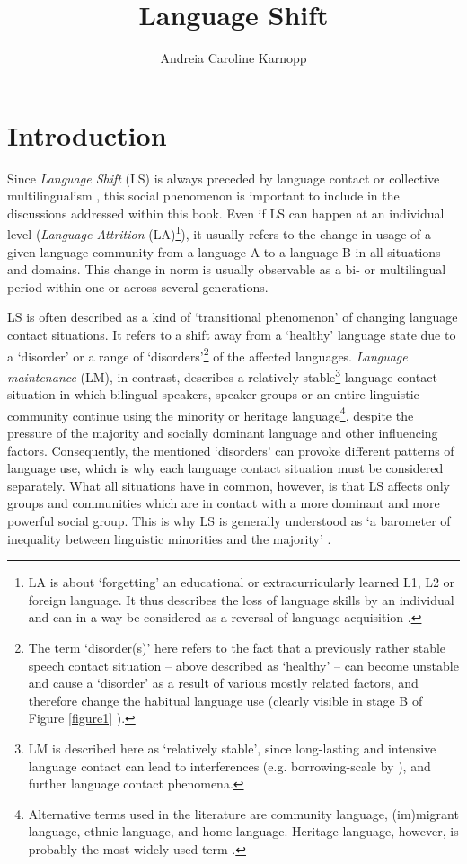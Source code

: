 \documentclass[output=paper,
modfonts
]{langscibook}
\title{Language Shift}
\author{%
 Andreia Caroline Karnopp\affiliation{University of Zurich}
}
\begin{document}
\maketitle

\section{Introduction}

Since \emph{Language Shift} (LS) is always preceded by language contact or collective multilingualism \parencite[320]{Ostler2011}, this social phenomenon is important to include in the discussions addressed within this book. Even if LS can happen at an individual level (\emph{Language Attrition} (LA)\footnote{LA is about ‘forgetting' an educational or extracurricularly learned L1, L2 or foreign language. It thus describes the loss of language skills by an individual and can in a way be considered as a reversal of language acquisition \parencite{Lambert1982}.}), it usually refers to the change in usage of a given language community from a language A to a language B in all situations and domains. This change in norm is usually observable as a bi- or multilingual period within one or across several generations.

LS is often described as a kind of `transitional phenomenon' \parencite[33]{Bohm2010} of changing language contact situations. It refers to a shift away from a `healthy' language state due to a `disorder' or a range of `disorders'\footnote{The term ‘disorder(s)' here refers to the fact that a previously rather stable speech contact situation -- above described as ‘healthy' -- can become unstable and cause a ‘disorder' as a result of various mostly related factors, and therefore change the habitual language use (clearly visible in stage B of Figure \ref{figure1} ).} of the affected languages. \emph{Language maintenance} (LM), in contrast, describes a relatively stable\footnote{LM is described here as ‘relatively stable', since long-lasting and intensive language contact can lead to interferences (e.g. borrowing-scale by \citealt{thomasonkaufman1988}), and further language contact phenomena.} language contact situation in which bilingual speakers, speaker groups or an entire linguistic community continue using the minority or heritage language\footnote{Alternative terms used in the literature are community language, (im)migrant language, ethnic language, and home language. Heritage language, however, is probably the most widely used term \parencite[23]{Pauwels2016}.}, despite the pressure of the majority and socially dominant language and other influencing factors. Consequently, the mentioned `disorders' can provoke different patterns of language use, which is why each language contact situation must be considered separately. What all situations have in common, however, is that LS affects only groups and communities which are in contact with a more dominant and more powerful social group. This is why LS is generally understood as ‘a barometer of inequality between linguistic minorities and the majority’ \parencite[613]{Heinrich2015}.
\end{document}

